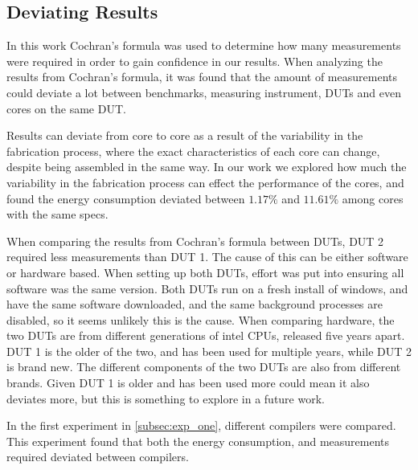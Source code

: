 \subsection{Deviating Results}

In this work Cochran's formula was used to determine how many measurements were required in order to gain confidence in our results. When analyzing the results from Cochran's formula, it was found that the amount of measurements could deviate a lot between benchmarks, measuring instrument, DUTs and even cores on the same DUT.

Results can deviate from core to core as a result of the variability in the fabrication process, where the exact characteristics of each core can change, despite being assembled in the same way.\cite{Mauzy2020} In our work we explored how much the variability in the fabrication process can effect the performance of the cores, and found the energy consumption deviated between $1.17\%$ and $11.61\%$ among cores with the same specs.

When comparing the results from Cochran's formula between DUTs, DUT 2 required less measurements than DUT 1. The cause of this can be either software or hardware based. When setting up both DUTs, effort was put into ensuring all software was the same version. Both DUTs run on a fresh install of windows, and have the same software downloaded, and the same background processes are disabled, so it seems unlikely this is the cause. When comparing hardware, the two DUTs are from different generations of intel CPUs, released five years apart. DUT 1 is the older of the two, and has been used for multiple years, while DUT 2 is brand new. The different components of the two DUTs are also from different brands. Given DUT 1 is older and has been used more could mean it also deviates more, but this is something to explore in a future work.

In the first experiment in \cref{subsec:exp_one}, different compilers were compared. This experiment found that both the energy consumption, and measurements required deviated between compilers.




